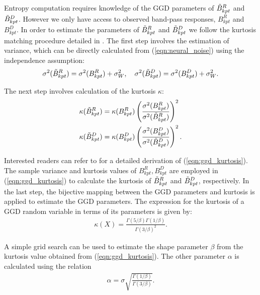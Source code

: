 \documentclass[journal]{IEEEtran}
\begin{document}
Entropy computation requires knowledge of the GGD parameters of $\Tilde{B}_{kpt}^R$ and $\Tilde{B}_{kpt}^D$. However we only have access to observed band-pass responses, $B_{kpt}^R$ and $B_{kpt}^D$. In order to estimate the parameters of $\Tilde{B}_{kpt}^R$ and $\Tilde{B}_{kpt}^D$ we follow the kurtosis matching procedure detailed in \cite{soury2015new}. The first step involves the estimation of variance, which can be directly calculated from (\ref{eqn:neural_noise}) using the independence assumption:
\begin{equation}
\begin{aligned}
    \sigma^2(\Tilde{B}_{kpt}^R) = \sigma^2(B_{kpt}^R) + \sigma_W ^2, \quad
    \sigma^2(\Tilde{B}_{kpt}^D) = \sigma^2(B_{kpt}^D) + \sigma_W ^2.
\end{aligned}
\label{eqn:ggd_variance}
\end{equation}

The next step involves calculation of the kurtosis $\kappa$:
\begin{equation}
\begin{aligned}
    \kappa(\Tilde{B}_{kpt}^R) &= \kappa(B_{kpt}^R)\left(\frac{\sigma^2(B_{kpt}^R)}{\sigma^2(\Tilde{B}_{kpt}^R)} \right)^2 \\
    \kappa(\Tilde{B}_{kpt}^D) &= \kappa(B_{kpt}^D)\left(\frac{\sigma^2(B_{kpt}^D)}{\sigma^2(\Tilde{B}_{kpt}^D)} \right)^2.
\end{aligned}
\label{eqn:ggd_kurtosis}
\end{equation}

Interested readers can refer to \cite{soury2015new,pan2012exposing} for a detailed derivation of (\ref{eqn:ggd_kurtosis}). The sample variance and kurtosis values of $B_{kpt}^R,B_{kpt}^D$ are employed in (\ref{eqn:ggd_kurtosis}) to calculate the kurtosis of $\Tilde{B}_{kpt}^R$ and $\Tilde{B}_{kpt}^D$, respectively. In the last step, the bijective mapping between the GGD parameters and kurtosis \cite{soury2015new} is applied to estimate the GGD parameters. The expression for the kurtosis of a GGD random variable in terms of its parameters is given by:
\begin{align}
    \kappa(X) = \frac{\Gamma(5/\beta)\Gamma(1/\beta)}{\Gamma(3/\beta)^2}. 
    \label{eqn:param_beta}
\end{align}

A simple grid search can be used to estimate the shape parameter $\beta$ from the kurtosis value obtained from (\ref{eqn:ggd_kurtosis}). The other parameter $\alpha$ is calculated using the relation 
\begin{align}
    \alpha = \sigma \sqrt{\frac{\Gamma(1/\beta)}{\Gamma(3/\beta)}}.
    \label{eqn:param_alpha}
\end{align}
\end{document}
